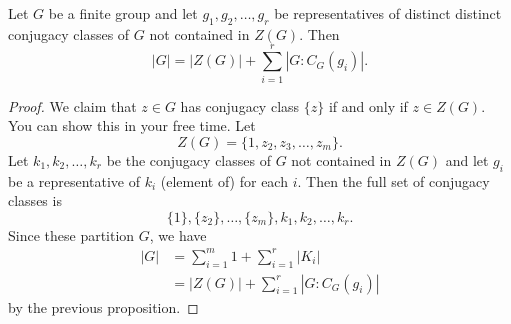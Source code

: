 \begin{theorem}
   Let \( G  \) be a finite group and let \( {g}_{1}, {g}_{2}, \dots , {g}_{r} \) be representatives of distinct distinct conjugacy classes of \( G  \) not contained in \( Z(G) \). Then  
   \[  | G  |  = | Z(G) |  + \sum_{ i=1  }^{ r } | G : {C}_{G}({g}_{i}) |. \]
\end{theorem}
\begin{proof}
We claim that \( z \in G \) has conjugacy class \( \{  z  \}  \) if and only if \( z \in Z(G) \). You can show this in your free time. Let 
\[  Z(G) = \{  1, {z}_{2}, {z}_{3}, \dots, {z}_{m} \}.  \]
Let \( {k}_{1}, {k}_{2}, \dots, {k}_{r} \) be the conjugacy classes of \( G  \) not contained in \( Z(G) \) and let \( {g}_{i} \) be a representative of \( {k}_{i} \) (element of) for each \( i  \). Then the full set of conjugacy classes is \[ \{ 1 \} , \{ {z}_{2} \}, \dots, \{ {z}_{m} \}, {k}_{1}, {k}_{2}, \dots, {k}_{r}. \]
Since these partition \( G  \), we have 
\begin{align*}
    | G  |  &= \sum_{ i=1  }^{ m } 1 + \sum_{ i=1  }^{ r } | {K}_{i} |  \\
            &= | Z(G) |  + \sum_{ i=1  }^{ r  } | G : {C}_{G}({g}_{i}) | 
\end{align*}
by the previous proposition.
\end{proof}

